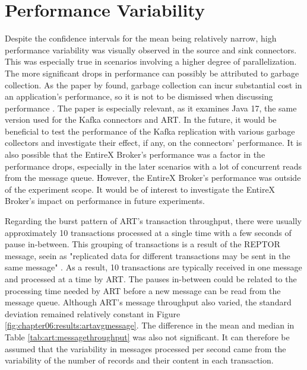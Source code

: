 \section{Performance Variability}
\label{ch07:discussion:performancevariability}
Despite the confidence intervals for the mean being relatively narrow, high performance variability was visually observed in the source and sink connectors. This was especially true in scenarios involving a higher degree of parallelization. The more significant drops in performance can possibly be attributed to garbage collection. As the paper by \citeauthor{cai2022distillinggc} found, garbage collection can incur substantial cost in an application's performance, so it is not to be dismissed when discussing performance \cite{cai2022distillinggc}. The paper is especially relevant, as it examines Java 17, the same version used for the Kafka connectors and \ac{ART}. In the future, it would be beneficial to test the performance of the Kafka replication with various garbage collectors and investigate their effect, if any, on the connectors' performance. It is also possible that the EntireX Broker's performance was a factor in the performance drops, especially in the later scenarios with a lot of concurrent reads from the message queue. However, the EntireX Broker's performance was outside of the experiment scope. It would be of interest to investigate the EntireX Broker's impact on performance in future experiments.

Regarding the burst pattern of \ac{ART}'s transaction throughput, there were usually approximately 10 transactions processed at a single time with a few seconds of pause in-between. This grouping of transactions is a result of the \ac{REPTOR} message, seein as "replicated data for different transactions may be sent in the same message" \cite{reptorprogrammersref}. As a result, 10 transactions are typically received in one message and processed at a time by \ac{ART}. The pauses in-between could be related to the processing time needed by \ac{ART} before a new message can be read from the message queue. 
Although \ac{ART}'s message throughput also varied, the standard deviation remained relatively constant in Figure \ref{fig:chapter06:results:artavgmessage}. The difference in the mean and median in Table \ref{tab:art:messagethroughput} was also not significant. It can therefore be assumed that the variability in messages processed per second came from the variability of the number of records and their content in each transaction.

